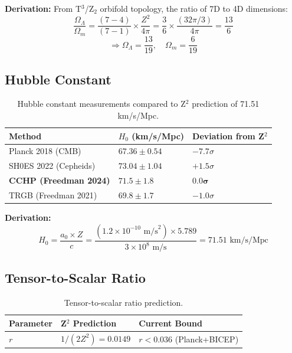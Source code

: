 \documentclass[12pt,a4paper]{article}
\begin{document}
\textbf{Derivation:} From T$^3$/Z$_2$ orbifold topology, the ratio of 7D to 4D dimensions:
\begin{equation}
\frac{\Omega_\Lambda}{\Omega_m} = \frac{(7-4)}{(7-1)} \times \frac{Z^2}{4\pi} = \frac{3}{6} \times \frac{(32\pi/3)}{4\pi} = \frac{13}{6}
\end{equation}
\begin{equation}
\Rightarrow \Omega_\Lambda = \frac{13}{19}, \quad \Omega_m = \frac{6}{19}
\end{equation}

\subsection{Hubble Constant}

\begin{table}[h]
\centering
\begin{tabular}{@{}lll@{}}
\toprule
Method & $H_0$ (km/s/Mpc) & Deviation from Z$^2$ \\
\midrule
Planck 2018 (CMB) & $67.36 \pm 0.54$ & $-7.7\sigma$ \\
SH0ES 2022 (Cepheids) & $73.04 \pm 1.04$ & $+1.5\sigma$ \\
\textbf{CCHP (Freedman 2024)} & $\mathbf{71.5 \pm 1.8}$ & $\mathbf{0.0\sigma}$ \\
TRGB (Freedman 2021) & $69.8 \pm 1.7$ & $-1.0\sigma$ \\
\bottomrule
\end{tabular}
\caption{Hubble constant measurements compared to Z$^2$ prediction of 71.51 km/s/Mpc.}
\end{table}

\textbf{Derivation:}
\begin{equation}
H_0 = \frac{a_0 \times Z}{c} = \frac{(1.2 \times 10^{-10} \text{ m/s}^2) \times 5.789}{3 \times 10^8 \text{ m/s}} = 71.51 \text{ km/s/Mpc}
\end{equation}

\subsection{Tensor-to-Scalar Ratio}

\begin{table}[h]
\centering
\begin{tabular}{@{}lll@{}}
\toprule
Parameter & Z$^2$ Prediction & Current Bound \\
\midrule
$r$ & $1/(2Z^2) = 0.0149$ & $r < 0.036$ (Planck+BICEP) \\
\bottomrule
\end{tabular}
\caption{Tensor-to-scalar ratio prediction.}
\end{table}
\end{document}
